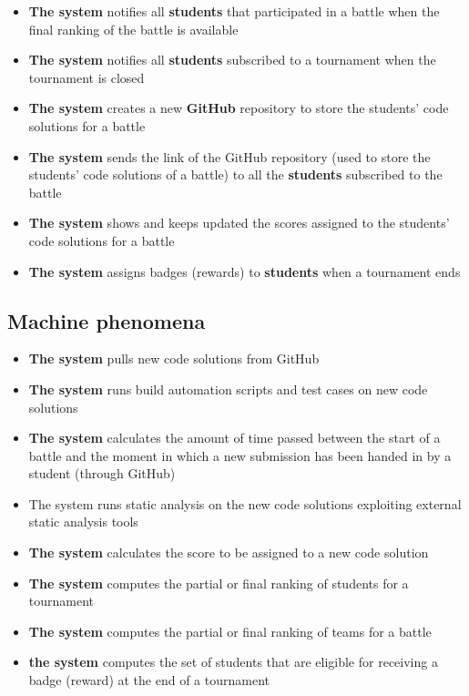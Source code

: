 \begin{itemize}
		\item \textbf{The system} notifies all \textbf{students} that participated in a battle when the final ranking of the battle is available
		\item \textbf{The system} notifies all \textbf{students} subscribed to a tournament when the tournament is closed
		\item \textbf{The system} creates a new \textbf{GitHub} repository to store the students’ code solutions for a battle
		\item \textbf{The system} sends the link of the GitHub repository (used to store the students' code solutions of a battle) to all the \textbf{students} subscribed to the battle
		\item \textbf{The system} shows and keeps updated the scores assigned to the students' code solutions for a battle
		\item \textbf{The system} assigns badges (rewards) to \textbf{students} when a tournament ends
	\end{itemize}
	
	\subsection{Machine phenomena}
	
	\begin{itemize}
		\item \textbf{The system} pulls new code solutions from GitHub
		\item \textbf{The system} runs build automation scripts and test cases on new code solutions
		\item \textbf{The system} calculates the amount of time passed between the start of a battle and the moment in which a new submission has been handed in by a student (through GitHub)
		\item The system runs static analysis on the new code solutions exploiting external static analysis tools
		\item \textbf{The system} calculates the score to be assigned to a new code solution
		\item \textbf{The system} computes the partial or final ranking of students for a tournament
		\item \textbf{The system} computes the partial or final ranking of teams for a battle
		\item \textbf{the system} computes the set of students that are eligible for receiving a badge (reward) at the end of a tournament
	\end{itemize}
	
